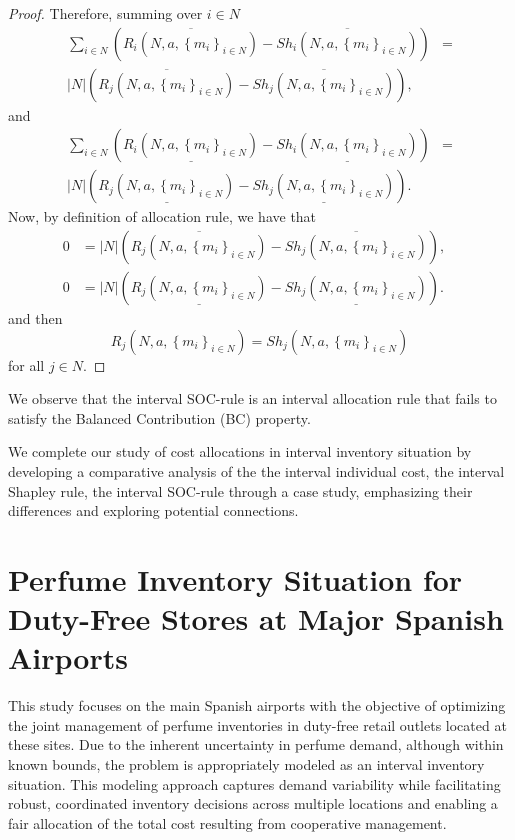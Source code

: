 \documentclass[12pt]{article}
\begin{document}
\begin{proof}
Therefore, summing over $i\in N$
\begin{eqnarray*}
\sum_{i\in N}\left(\overline{R_{i}(N,a,\left\{ m_{i}\right\} _{i\in
N})} - \overline{Sh_{i}(N,a,\left\{ m_{i}\right\} _{i\in
N})}\right)
 &=\\
 |N|\left(\overline{R_{j}(N,a,\left\{ m_{i}\right\} _{i\in
N})} -
\overline{Sh_{j}(N,a,\left\{ m_{i}\right\} _{i\in
N})}\right),
\end{eqnarray*}%
and
\begin{eqnarray*}
\sum_{i\in N}\left(\underline{R_{i}(N,a,\left\{ m_{i}\right\} _{i\in
N})} - \underline{Sh_{i}(N,a,\left\{ m_{i}\right\} _{i\in
N})}\right)
 &=\\
 |N|\left(\underline{R_{j}(N,a,\left\{ m_{i}\right\} _{i\in
N})} -
\underline{Sh_{j}(N,a,\left\{ m_{i}\right\} _{i\in
N})}\right).&
\end{eqnarray*}%
Now, by definition of allocation rule, we have that
\begin{eqnarray*}
0
 &=
 |N|\left(\overline{R_{j}(N,a,\left\{ m_{i}\right\} _{i\in
N})} -
\overline{Sh_{j}(N,a,\left\{ m_{i}\right\} _{i\in
N})}\right),&\\
0
 &=
 |N|\left(\underline{R_{j}(N,a,\left\{ m_{i}\right\} _{i\in
N})} -
\underline{Sh_{j}(N,a,\left\{ m_{i}\right\} _{i\in
N})}\right).&
\end{eqnarray*}%
and then 
\begin{equation*}
R_{j}(N,a,\left\{ m_{i}\right\} _{i\in
N}) =Sh_{j}(N,a,\left\{ m_{i}\right\} _{i\in
N})
\end{equation*}
for all $j\in N$.
\end{proof}

We observe that the interval SOC-rule is an interval allocation rule that fails to satisfy the Balanced Contribution (BC) property. 

We complete our study of cost allocations in interval inventory situation by developing a comparative analysis of the the interval individual cost, the interval Shapley rule, the interval SOC-rule  through a case study, emphasizing their differences and exploring potential connections.


\section{Perfume Inventory Situation for Duty-Free Stores at Major Spanish Airports}\label{sec:5}


This study focuses on the main Spanish airports with the objective of optimizing the joint management of perfume inventories in duty-free retail outlets located at these sites. Due to the inherent uncertainty in perfume demand, although within known bounds, the problem is appropriately modeled as an interval inventory situation. This modeling approach captures demand variability while facilitating robust, coordinated inventory decisions across multiple locations and enabling a fair allocation of the total cost resulting from cooperative management.
\end{document}
